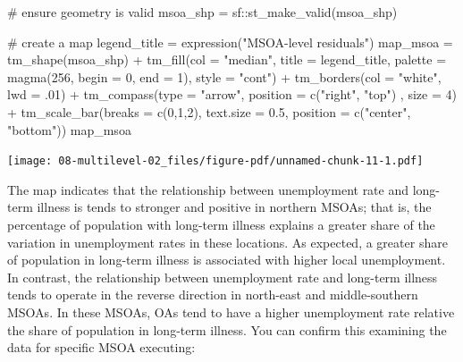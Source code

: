 \documentclass[
  letterpaper,
  DIV=11,
  numbers=noendperiod,
  oneside]{scrreprt}
\newenvironment{Shaded}{\begin{snugshade}}{\end{snugshade}}
\newcommand{\AttributeTok}[1]{\textcolor[rgb]{0.40,0.45,0.13}{#1}}
\newcommand{\CommentTok}[1]{\textcolor[rgb]{0.37,0.37,0.37}{#1}}
\newcommand{\DecValTok}[1]{\textcolor[rgb]{0.68,0.00,0.00}{#1}}
\newcommand{\FloatTok}[1]{\textcolor[rgb]{0.68,0.00,0.00}{#1}}
\newcommand{\FunctionTok}[1]{\textcolor[rgb]{0.28,0.35,0.67}{#1}}
\newcommand{\NormalTok}[1]{\textcolor[rgb]{0.00,0.23,0.31}{#1}}
\newcommand{\OtherTok}[1]{\textcolor[rgb]{0.00,0.23,0.31}{#1}}
\newcommand{\SpecialCharTok}[1]{\textcolor[rgb]{0.37,0.37,0.37}{#1}}
\newcommand{\StringTok}[1]{\textcolor[rgb]{0.13,0.47,0.30}{#1}}
\begin{document}
\begin{Shaded}
\begin{Highlighting}[]
\CommentTok{\# ensure geometry is valid}
\NormalTok{msoa\_shp }\OtherTok{=}\NormalTok{ sf}\SpecialCharTok{::}\FunctionTok{st\_make\_valid}\NormalTok{(msoa\_shp)}

\CommentTok{\# create a map}
\NormalTok{legend\_title }\OtherTok{=} \FunctionTok{expression}\NormalTok{(}\StringTok{"MSOA{-}level residuals"}\NormalTok{)}
\NormalTok{map\_msoa }\OtherTok{=} \FunctionTok{tm\_shape}\NormalTok{(msoa\_shp) }\SpecialCharTok{+}
  \FunctionTok{tm\_fill}\NormalTok{(}\AttributeTok{col =} \StringTok{"median"}\NormalTok{, }\AttributeTok{title =}\NormalTok{ legend\_title, }\AttributeTok{palette =} \FunctionTok{magma}\NormalTok{(}\DecValTok{256}\NormalTok{, }\AttributeTok{begin =} \DecValTok{0}\NormalTok{, }\AttributeTok{end =} \DecValTok{1}\NormalTok{), }\AttributeTok{style =} \StringTok{"cont"}\NormalTok{) }\SpecialCharTok{+} 
  \FunctionTok{tm\_borders}\NormalTok{(}\AttributeTok{col =} \StringTok{"white"}\NormalTok{, }\AttributeTok{lwd =}\NormalTok{ .}\DecValTok{01}\NormalTok{)  }\SpecialCharTok{+} 
  \FunctionTok{tm\_compass}\NormalTok{(}\AttributeTok{type =} \StringTok{"arrow"}\NormalTok{, }\AttributeTok{position =} \FunctionTok{c}\NormalTok{(}\StringTok{"right"}\NormalTok{, }\StringTok{"top"}\NormalTok{) , }\AttributeTok{size =} \DecValTok{4}\NormalTok{) }\SpecialCharTok{+} 
  \FunctionTok{tm\_scale\_bar}\NormalTok{(}\AttributeTok{breaks =} \FunctionTok{c}\NormalTok{(}\DecValTok{0}\NormalTok{,}\DecValTok{1}\NormalTok{,}\DecValTok{2}\NormalTok{), }\AttributeTok{text.size =} \FloatTok{0.5}\NormalTok{, }\AttributeTok{position =}  \FunctionTok{c}\NormalTok{(}\StringTok{"center"}\NormalTok{, }\StringTok{"bottom"}\NormalTok{)) }
\NormalTok{map\_msoa}
\end{Highlighting}
\end{Shaded}

\texttt{[image: 08-multilevel-02\_files/figure-pdf/unnamed-chunk-11-1.pdf]}

The map indicates that the relationship between unemployment rate and
long-term illness is tends to stronger and positive in northern MSOAs;
that is, the percentage of population with long-term illness explains a
greater share of the variation in unemployment rates in these locations.
As expected, a greater share of population in long-term illness is
associated with higher local unemployment. In contrast, the relationship
between unemployment rate and long-term illness tends to operate in the
reverse direction in north-east and middle-southern MSOAs. In these
MSOAs, OAs tend to have a higher unemployment rate relative the share of
population in long-term illness. You can confirm this examining the data
for specific MSOA executing:
\end{document}
